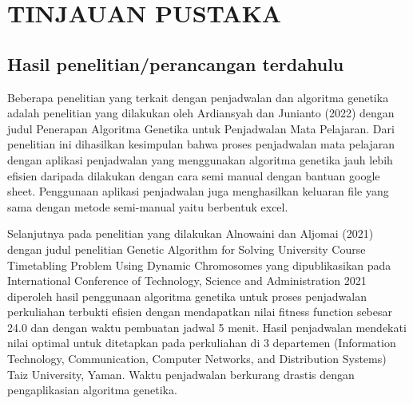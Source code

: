 \chapter{TINJAUAN PUSTAKA}
\label{chap:tinjauanpustaka}


\section{Hasil penelitian/perancangan terdahulu }
\label{sec:roketluarangkasa}




Beberapa penelitian yang terkait dengan penjadwalan dan algoritma genetika adalah 
\linebreak penelitian yang dilakukan oleh Ardiansyah dan Junianto (2022) 
dengan judul Penerapan \linebreak Algoritma Genetika untuk Penjadwalan Mata Pelajaran. 
Dari penelitian ini dihasilkan kesimpulan bahwa proses penjadwalan mata pelajaran dengan 
aplikasi penjadwalan yang menggunakan algoritma genetika jauh lebih efisien daripada 
dilakukan dengan cara semi manual dengan bantuan google sheet. Penggunaan aplikasi 
penjadwalan juga menghasilkan keluaran file yang sama dengan metode semi-manual yaitu berbentuk excel.

Selanjutnya pada penelitian yang dilakukan Alnowaini dan Aljomai (2021) dengan judul penelitian 
Genetic Algorithm for Solving University Course Timetabling Problem Using Dynamic Chromosomes 
yang dipublikasikan pada International Conference of Technology, Science and Administration 2021 
diperoleh hasil penggunaan algoritma genetika untuk proses penjadwalan perkuliahan terbukti efisien 
dengan mendapatkan nilai fitness function sebesar 24.0 dan dengan waktu pembuatan jadwal 5 menit. 
Hasil penjadwalan mendekati nilai optimal untuk ditetapkan pada perkuliahan di 3 departemen 
(Information Technology, Communication, Computer Networks, and Distribution Systems) Taiz University, Yaman. 
Waktu penjadwalan berkurang drastis dengan pengaplikasian algoritma genetika.

